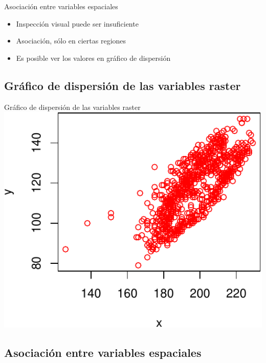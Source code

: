 \documentclass[
  11pt,
  ignorenonframetext,
]{beamer}
\begin{document}
\begin{frame}{Asociación entre variables espaciales}
\begin{itemize}
\item
  Inspección visual puede ser insuficiente
\item
  Asociación, sólo en ciertas regiones
\item
  Es posible ver los valores en gráfico de dispersión
\end{itemize}
\end{frame}

\hypertarget{gruxe1fico-de-dispersiuxf3n-de-las-variables-raster}{%
\subsection{Gráfico de dispersión de las variables
raster}\label{gruxe1fico-de-dispersiuxf3n-de-las-variables-raster}}

\begin{frame}{Gráfico de dispersión de las variables raster}
\includegraphics{Intro-asociacion_files/figure-beamer/unnamed-chunk-4-1.pdf}
\end{frame}

\hypertarget{asociaciuxf3n-entre-variables-espaciales-2}{%
\subsection{Asociación entre variables
espaciales}\label{asociaciuxf3n-entre-variables-espaciales-2}}
\end{document}
